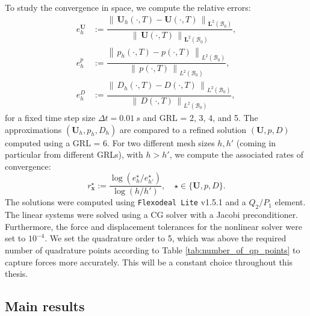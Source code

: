 \documentclass{sfuthesis}
\numberwithin{equation}{section}
\numberwithin{figure}{chapter}
\numberwithin{table}{chapter}
\theoremstyle{definition}
\def\*#1{{\mathbf{#1}}} %
\newcommand{\B}{\mathcal{B}}
\newcommand{\norm}[1]{{\left\| \, #1 \, \right\|}}
\begin{document}
To study the convergence in space, we compute the relative errors:
\begin{subequations}
    \begin{eqnarray}
        e^{\*U}_{h} &:= \dfrac{\norm{\*U_{h}(\cdot,T) - \*U(\cdot,T)}_{\*L^2(\B_0)}}{\norm{\*U(\cdot,T)}_{\*L^2(\B_0)}}, \\
        e^p_{h} &:= \dfrac{\norm{p_{h}(\cdot,T) - p(\cdot,T)}_{L^2(\B_0)}}{\norm{p(\cdot,T)}_{L^2(\B_0)}}, \\
        e^D_{h} &:= \dfrac{\norm{D_{h}(\cdot,T) - D(\cdot,T)}_{L^2(\B_0)}}{\norm{D(\cdot,T)}_{L^2(\B_0)}},
    \end{eqnarray}
\end{subequations}
for a fixed time step size $\Delta t = 0.01 \ \unit{s}$ and GRL = 2, 3, 4, and 5. The approximations $(\*U_h, p_h, D_h)$ are compared to a refined solution $(\*U,p,D)$ computed using a GRL = 6. For two different mesh sizes $h,h'$ (coming in particular from different GRLs), with $h>h'$, we compute the associated rates of convergence:
\begin{equation}
    r^\star_\*x := \dfrac{\log \left(e^\star_{h} / e^\star_{h'} \right)}{\log \left(h / h'  \right)}, \quad \star \in \{ \*U, p, D \}.
\end{equation}
The solutions were computed using \texttt{Flexodeal Lite} v1.5.1 and a $Q_2/P_1$ element. The linear systems were solved using a CG solver with a Jacobi preconditioner. Furthermore, the force and displacement tolerances for the nonlinear solver were set to $10^{-4}$. We set the quadrature order to 5, which was above the required number of quadrature points according to Table \ref{tab:number_of_qp_points} to capture forces more accurately. This will be a constant choice throughout this thesis.

\subsection{Main results}
\end{document}
